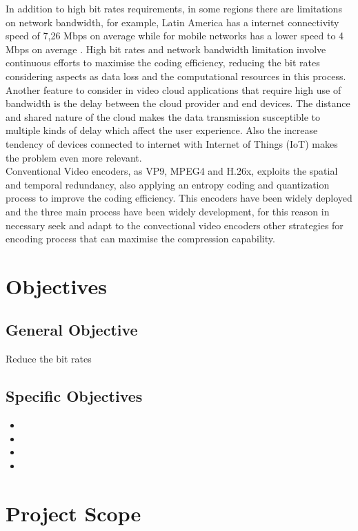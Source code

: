 In addition to high bit rates requirements, in some regions there are limitations on  network bandwidth, for example, Latin America has a internet connectivity speed of 7,26 Mbps on average while for mobile networks has a lower speed to 4 Mbps on average \cite{cepal}. High bit rates and network bandwidth limitation involve continuous efforts to maximise the coding efficiency, reducing the bit rates considering aspects as data loss and the computational resources in this process. Another feature to consider in video cloud applications that require high use of bandwidth is the delay between the cloud provider and end devices. The distance and shared nature of the cloud makes the data transmission susceptible to multiple kinds of delay which affect the user experience. Also the increase tendency of devices connected to internet with Internet of Things (IoT) makes the problem even more relevant. \\


Conventional Video encoders, as VP9, MPEG4 and H.26x, exploits the spatial and temporal redundancy, also applying an entropy coding and quantization process to improve the coding efficiency. This encoders have been  widely deployed and the three main process have been widely development, for this reason in necessary seek and adapt to the convectional video encoders other strategies for encoding process that can maximise the compression capability. 


\section{Objectives}
\subsection{General Objective}
Reduce the bit rates
\subsection{Specific Objectives}
\begin{itemize}
\item
\item
\item
\item
\end{itemize}

\section{Project Scope}


